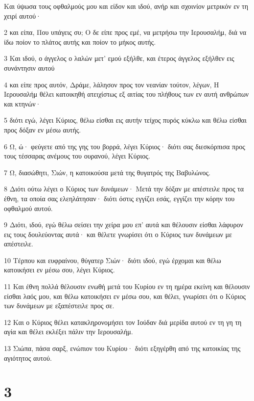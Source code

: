 \par Και ύψωσα τους οφθαλμούς μου και είδον και ιδού, ανήρ και σχοινίον μετρικόν εν τη χειρί αυτού·
\par 2 και είπα, Που υπάγεις συ; Ο δε είπε προς εμέ, να μετρήσω την Ιερουσαλήμ, διά να ίδω ποίον το πλάτος αυτής και ποίον το μήκος αυτής.
\par 3 Και ιδού, ο άγγελος ο λαλών μετ' εμού εξήλθε, και έτερος άγγελος εξήλθεν εις συνάντησιν αυτού
\par 4 και είπε προς αυτόν, Δράμε, λάλησον προς τον νεανίαν τούτον, λέγων, Η Ιερουσαλήμ θέλει κατοικηθή ατειχίστως εξ αιτίας του πλήθους των εν αυτή ανθρώπων και κτηνών·
\par 5 διότι εγώ, λέγει Κύριος, θέλω είσθαι εις αυτήν τείχος πυρός κύκλω και θέλω είσθαι προς δόξαν εν μέσω αυτής.
\par 6 Ω, ώ· φεύγετε από της γης του βορρά, λέγει Κύριος· διότι σας διεσκόρπισα προς τους τέσσαρας ανέμους του ουρανού, λέγει Κύριος.
\par 7 Ω, διασώθητι, Σιών, η κατοικούσα μετά της θυγατρός της Βαβυλώνος.
\par 8 Διότι ούτω λέγει ο Κύριος των δυνάμεων· Μετά την δόξαν με απέστειλε προς τα έθνη, τα οποία σας ελεηλάτησαν· διότι όστις εγγίζει εσάς, εγγίζει την κόρην του οφθαλμού αυτού.
\par 9 Διότι, ιδού, εγώ θέλω σείσει την χείρα μου επ' αυτά και θέλουσιν είσθαι λάφυρον εις τους δουλεύοντας αυτά· και θέλετε γνωρίσει ότι ο Κύριος των δυνάμεων με απέστειλε.
\par 10 Τέρπου και ευφραίνου, θύγατερ Σιών· διότι ιδού, εγώ έρχομαι και θέλω κατοικήσει εν μέσω σου, λέγει Κύριος.
\par 11 Και έθνη πολλά θέλουσιν ενωθή μετά του Κυρίου εν τη ημέρα εκείνη και θέλουσιν είσθαι λαός μου, και θέλω κατοικήσει εν μέσω σου, και θέλει, γνωρίσει ότι ο Κύριος των δυνάμεων με εξαπέστειλε προς σε.
\par 12 Και ο Κύριος θέλει κατακληρονομήσει τον Ιούδαν διά μερίδα αυτού εν τη γη τη αγία και θέλει εκλέξει πάλιν την Ιερουσαλήμ.
\par 13 Σιώπα, πάσα σαρξ, ενώπιον του Κυρίου· διότι εξηγέρθη από της κατοικίας της αγιότητος αυτού.

\chapter{3}

